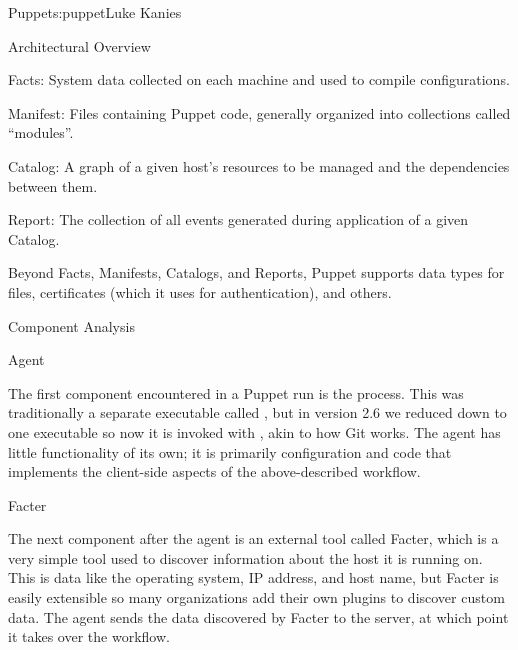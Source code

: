 \begin{aosachapter}{Puppet}{s:puppet}{Luke Kanies}
\begin{aosasect1}{Architectural Overview}
\begin{aosadescription}

\item{Facts:} System data collected on each machine and used to compile
  configurations.

\item{Manifest:} Files containing Puppet code, generally organized into
  collections called ``modules''.

\item{Catalog:} A graph of a given host's resources to be managed and
  the dependencies between them.

\item{Report:} The collection of all events generated during
  application of a given Catalog.

\end{aosadescription}

Beyond Facts, Manifests, Catalogs, and Reports, Puppet supports data
types for files, certificates (which it uses for authentication), and
others.

\end{aosasect1}

\begin{aosasect1}{Component Analysis}

\begin{aosasect2}{Agent}

The first component encountered in a Puppet run is the 
process.  This was traditionally a separate executable called
, but in version 2.6 we reduced down to one executable so now it
is invoked with , akin to how Git works.  The agent
has little functionality of its own; it is primarily configuration and
code that implements the client-side aspects of the above-described
workflow.

\end{aosasect2}

\begin{aosasect2}{Facter}

The next component after the agent is an external tool called Facter,
which is a very simple tool used to discover information about the
host it is running on.  This is data like the operating system, IP
address, and host name, but Facter is easily extensible so many
organizations add their own plugins to discover custom data.  The
agent sends the data discovered by Facter to the server, at which
point it takes over the workflow.

\end{aosasect2}


\end{aosasect1}
\end{aosachapter}
